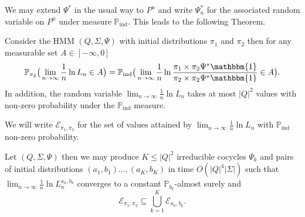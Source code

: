 \documentclass[a4paper,UKenglish,cleveref, autoref,mathscr]{lipics-v2019}
\newcommand{\Epsilon}{\mathcal{E}}
\newcommand{\PP}{\mathbb{P}}
\newcommand{\1}{\mathbbm{1}}
\newcommand{\liexp}{\lim_{n\rightarrow\infty} \frac1n \ln L_n}
\newcommand{\PPind}{\PP_{\text{ind}}}
\begin{document}
\begin{example}
We may extend $\Psi^*$ in the usual way to $P^n$ and write $\Psi_n^*$ for the associated random variable on $P^n$ under measure $\PPind$. This leads to the following Theorem.

\begin{theorem}
Consider the HMM $(Q, \Sigma, \Psi)$ with initial distributions $\pi_1$ and $\pi_2$ then for any measurable set $A \in [-\infty, 0]$
\begin{equation*}
\PP_{\pi_2}\big( \lim_{n\rightarrow\infty} \frac1n \ln L_n \in A\big) = \PPind\big(\lim_{n\rightarrow\infty} \frac1n \ln \frac{\pi_1 \times \pi_2 \Psi^* \1}{\pi_2 \times \pi_2 \Psi^* \1} \in A \big).
\end{equation*}
In addition, the random variable $\lim_{n\rightarrow\infty} \frac1n \ln L_n$ takes at most $|Q|^2$ values with non-zero probability under the $\PPind$ measure.
\end{theorem}

We will write $\Epsilon_{\pi_1, \pi_2}$ for the set of values attained by $\liexp$ with $\PPind$ non-zero probability. 

\begin{corollary}\label{subcompcalc}
Let $(Q, \Sigma, \Psi)$ then we may produce $K \leq |Q|^2$ irreducible cocycles $\Psi_k$ and pairs of initial distributions $(a_1, b_1) \dots, (a_K, b_K)$ in time $O(|Q|^4|\Sigma|)$ such that $\lim_{n \rightarrow \infty} \frac1n \ln L_n^{a_k, b_k}$ converges to a constant $\PP_{b_k}$-almost surely and
\begin{equation*}
\Epsilon_{\pi_1, \pi_2} \subseteq \bigcup_{k = 1}^K \Epsilon_{a_k, b_k}.
\end{equation*}
\end{corollary}

\end{example}
\end{document}
